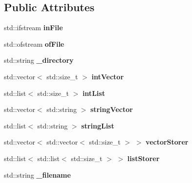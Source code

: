 \subsection*{Public Attributes}
\begin{DoxyCompactItemize}
\item 
\hypertarget{classdata_layer_ae862e8767b83ffb0c8677dfd017ebe2d}{}std\+::ifstream {\bfseries in\+File}\label{classdata_layer_ae862e8767b83ffb0c8677dfd017ebe2d}

\item 
\hypertarget{classdata_layer_a109520acac1f8d5bc41b7b7193074b40}{}std\+::ofstream {\bfseries of\+File}\label{classdata_layer_a109520acac1f8d5bc41b7b7193074b40}

\item 
\hypertarget{classdata_layer_a68d73a9df4c62e19cc763d87eebfe603}{}std\+::string {\bfseries \+\_\+directory}\label{classdata_layer_a68d73a9df4c62e19cc763d87eebfe603}

\item 
\hypertarget{classdata_layer_a5397e314212e5e3d2b0018ab30599f3f}{}std\+::vector$<$ std\+::size\+\_\+t $>$ {\bfseries int\+Vector}\label{classdata_layer_a5397e314212e5e3d2b0018ab30599f3f}

\item 
\hypertarget{classdata_layer_a12e94882b9ab2f5eb9efd50f19911d64}{}std\+::list$<$ std\+::size\+\_\+t $>$ {\bfseries int\+List}\label{classdata_layer_a12e94882b9ab2f5eb9efd50f19911d64}

\item 
\hypertarget{classdata_layer_a4cb4aa1196957e2557020fc2a5fa84f5}{}std\+::vector$<$ std\+::string $>$ {\bfseries string\+Vector}\label{classdata_layer_a4cb4aa1196957e2557020fc2a5fa84f5}

\item 
\hypertarget{classdata_layer_af3f560c7b8727ed3f4ddf8f50dd09927}{}std\+::list$<$ std\+::string $>$ {\bfseries string\+List}\label{classdata_layer_af3f560c7b8727ed3f4ddf8f50dd09927}

\item 
\hypertarget{classdata_layer_af15c46bfc1df95c928793836a9db9ab3}{}std\+::vector$<$ std\+::vector$<$ std\+::size\+\_\+t $>$ $>$ {\bfseries vector\+Storer}\label{classdata_layer_af15c46bfc1df95c928793836a9db9ab3}

\item 
\hypertarget{classdata_layer_adbe820aa1352d66c245e01e25ad2e024}{}std\+::list$<$ std\+::list$<$ std\+::size\+\_\+t $>$ $>$ {\bfseries list\+Storer}\label{classdata_layer_adbe820aa1352d66c245e01e25ad2e024}

\item 
\hypertarget{classdata_layer_a6f2da2b5e0caf2710ae430fc1d56d87b}{}std\+::string {\bfseries \+\_\+filename}\label{classdata_layer_a6f2da2b5e0caf2710ae430fc1d56d87b}

\end{DoxyCompactItemize}
